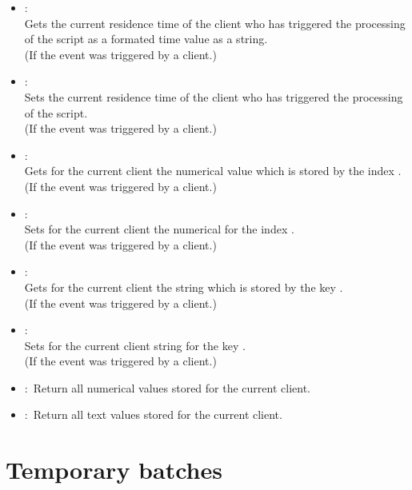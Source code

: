 \begin{itemize}
\item
{}:\\
Gets the current residence time of the client who has triggered the processing of the script as a formated time value as a string.\\
(If the event was triggered by a client.)

\item
{}:\\
Sets the current residence time of the client who has triggered the processing of the script.\\
(If the event was triggered by a client.)

\item
{}:\\
Gets for the current client the numerical value which is stored by the index .\\
(If the event was triggered by a client.)
  
\item
{}:\\
Sets for the current client the numerical  for the index .\\
(If the event was triggered by a client.)

\item
{}:\\
Gets for the current client the string which is stored by the key .\\
(If the event was triggered by a client.)
  
\item
{}:\\
Sets for the current client string  for the key .\\
(If the event was triggered by a client.)

\item
{}:\
Return all numerical values stored for the current client.
  
\item
{}:\
Return all text values stored for the current client.

\end{itemize}

\section{Temporary batches}

